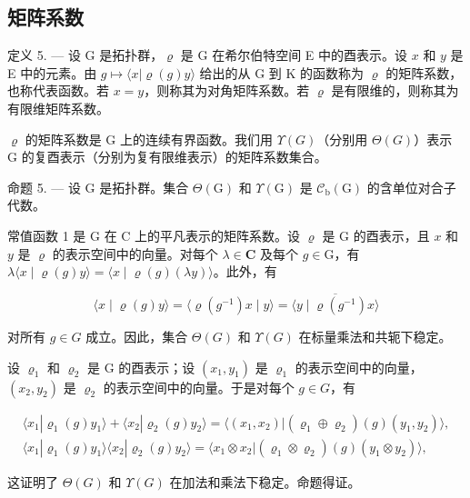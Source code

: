 \subsection{矩阵系数}

定义 5. --- 设 G 是拓扑群，\(\varrho\) 是 G 在希尔伯特空间 E 中的酉表示。设 \(x\) 和 \(y\) 是 E 中的元素。由 \(g \mapsto \langle x | \varrho(g)y \rangle\) 给出的从 G 到 K 的函数称为 \(\varrho\) 的矩阵系数，也称代表函数。若 \(x = y\)，则称其为对角矩阵系数。若 \(\varrho\) 是有限维的，则称其为有限维矩阵系数。

\(\varrho\) 的矩阵系数是 G 上的连续有界函数。我们用 \(\Upsilon(G)\)（分别用 \(\Theta(G)\)）表示 G 的复酉表示（分别为复有限维表示）的矩阵系数集合。

命题 5. — 设 G 是拓扑群。集合 \(\Theta(\mathrm{G})\) 和 \(\Upsilon(\mathrm{G})\) 是 \(\mathcal{C}_{\mathrm{b}}(\mathrm{G})\) 的含单位对合子代数。

常值函数 1 是 G 在 C 上的平凡表示的矩阵系数。设 \(\varrho\) 是 G 的酉表示，且 \(x\) 和 \(y\) 是 \(\varrho\) 的表示空间中的向量。对每个 \(\lambda \in \mathbf{C}\) 及每个 \(g \in \mathrm{G}\)，有 \(\lambda \langle x \mid \varrho(g)y \rangle = \langle x \mid \varrho(g)(\lambda y) \rangle\)。此外，有

\[
\langle x \mid \varrho (g) y \rangle = \langle \varrho (g ^ {- 1}) x \mid y \rangle = \overline {{\langle y \mid \varrho (g ^ {- 1}) x \rangle}}
\]

对所有 \(g \in G\) 成立。因此，集合 \(\Theta(G)\) 和 \(\Upsilon(G)\) 在标量乘法和共轭下稳定。

设 \(\varrho_{1}\) 和 \(\varrho_{2}\) 是 G 的酉表示；设 \((x_{1}, y_{1})\) 是 \(\varrho_{1}\) 的表示空间中的向量，\((x_{2}, y_{2})\) 是 \(\varrho_{2}\) 的表示空间中的向量。于是对每个 \(g \in G\)，有

\[
\begin{array}{c} \langle x _ {1}   |   \varrho_ {1} (g) y _ {1} \rangle + \langle x _ {2}   |   \varrho_ {2} (g) y _ {2} \rangle = \langle (x _ {1}, x _ {2})   |   (\varrho_ {1} \oplus \varrho_ {2}) (g) (y _ {1}, y _ {2}) \rangle , \\ \langle x _ {1}   |   \varrho_ {1} (g) y _ {1} \rangle \langle x _ {2}   |   \varrho_ {2} (g) y _ {2} \rangle = \langle x _ {1} \otimes x _ {2}   |   (\varrho_ {1} \otimes \varrho_ {2}) (g) (y _ {1} \otimes y _ {2}) \rangle , \end{array}
\]

这证明了 \(\Theta(G)\) 和 \(\Upsilon(G)\) 在加法和乘法下稳定。命题得证。

